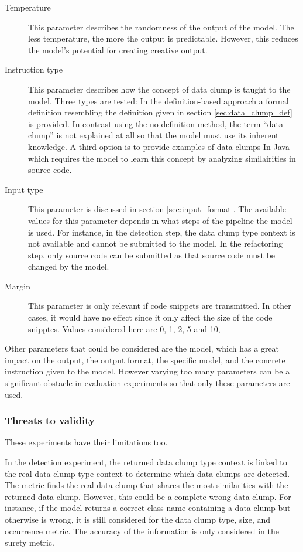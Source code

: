 \begin{description}
	\item [Temperature] This parameter describes the randomness of the output of the model. The less temperature, the more the output is predictable. However, this reduces the model's potential for creating creative output.
	
	\item[Instruction type] This parameter describes how the concept of data clump is taught to the model. Three types are tested: In the definition-based approach a formal definition resembling the definition given in section \ref{sec:data_clump_def} is provided. In contrast using the no-definition method, the term \enquote{data clump} is not explained at all so that the model must use its inherent knowledge. A third option is to provide examples of data clumps In Java which requires the model to learn this concept by analyzing similairities in source code.  
	
	\item [Input type] This parameter is discussed in section \ref{sec:input_format}. The available values for this parameter depends in what steps of the pipeline the model is used. For instance, in the detection step, the data clump type context is not available and cannot be submitted to the model. In the refactoring step, only source code can be submitted as that source code must be changed by the model.
	
	\item [Margin] This parameter is only relevant if code snippets are transmitted. In other cases, it would have no effect since it only affect the size of the code snipptes. Values considered here are 0, 1, 2, 5 and 10, 
	
	
\end{description}

Other parameters that could be considered are the model, which has a great impact on the output, the output format, the specific model, and the concrete instruction given to the model. However varying too many parameters can be a significant obstacle in evaluation experiments so that only these parameters are used. 

\subsubsection{Threats to validity}

These experiments have their limitations too. 

In the detection experiment, the returned data clump type context is linked to the real data clump type context to determine which data clumps are detected. The metric finds the real data clump that shares the most similarities with the returned data clump. However, this could be a complete wrong data clump. For instance, if the model returns a correct class name containing a data clump but otherwise is wrong, it is still considered for the data clump type, size, and occurrence metric. The accuracy of the information is only considered in the surety metric.

